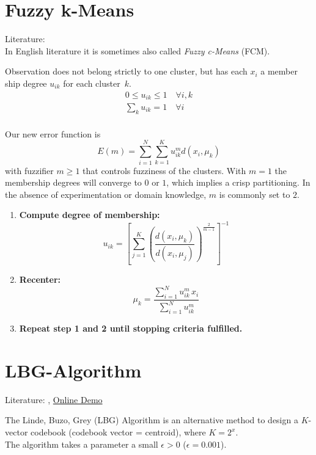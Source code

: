 \section{Fuzzy k-Means}\label{sec:fuzzy-kmeans}
Literature: \cite{Introduction2000}\\
In English literature it is sometimes also called \emph{Fuzzy c-Means} (FCM).

Observation does not belong strictly to one cluster, but has each $x_i$ a
member ship degree $u_{ik}$ for each cluster~$k$.
\begin{align}
0 \leq u_{ik} \leq 1 \quad \forall i, k\\
\sum_k u_{ik} = 1 \quad \forall i\\
\end{align}

Our new error function is
\begin{equation}\label{eq:fuzzy-kmeans-error}
E(m) = \sum_{i=1}^N \sum_{k=1}^K u_{ik}^m d(x_i, \mu_k)
\end{equation}
with fuzzifier $m \geq 1$ that controls fuzziness of the clusters. With $m=1$
the membership degrees will converge to $0$ or $1$, which implies a crisp
partitioning. In the absence of experimentation or domain knowledge, $m$ is
commonly set to $2$.

\begin{enumerate}
\item \textbf{Compute degree of membership:}
	$$u_{ik} = \left[ \sum_{j=1}^K \left( \frac{d(x_i, \mu_k)}{d(x_i, \mu_j)} \right)^{\frac{2}{m-1}} \right]^{-1}$$
\item \textbf{Recenter:}
	$$\mu_k = \frac{\sum_{i=1}^N u_{ik}^m \, x_i}{\sum_{i=1}^N u_{ik}^m}$$
\item \textbf{Repeat step 1 and 2 until stopping criteria fulfilled.}
\end{enumerate}

\section{LBG-Algorithm}
Literature: \cite{Linde1980}, \href{http://www.data-compression.com/vqanim.shtml}{Online Demo}

The Linde, Buzo, Grey (LBG) Algorithm is an alternative method to design a $K$-vector codebook (codebook vector = centroid), where $K=2^x$.\\
The algorithm takes a parameter a small $\epsilon > 0$ (\eg $\epsilon=0.001$).

